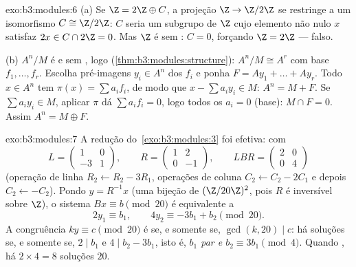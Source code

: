 \begin{solution}{exo:b3:modules:6}
(a) Se $\Z = 2\Z \oplus C$, a projeção $\Z \to \Z/2\Z$ se restringe a um isomorfismo $C \cong \Z/2\Z$: $C$
seria um subgrupo de $\Z$ cujo elemento não nulo $x$ satisfaz
$2x \in C
\cap 2\Z = 0$. Mas $\Z$ é sem : $C = 0$, forçando $\Z =
2\Z$ --- falso.

(b) $A^n/M$ é  e sem , logo 
(\cref{thm:b3:modules:structure}): $A^n/M \cong A^r$ com base $f_1, \dots, f_r$. Escolha pré-imagens $y_i \in A^n$ dos
$f_i$ e ponha $F = Ay_1 + \dots + Ay_r$. Todo $x \in A^n$ tem $\pi(x)
= \sum a_if_i$, de modo que $x - \sum a_iy_i \in M$: $A^n = M + F$.
Se $\sum a_iy_i \in M$, aplicar $\pi$ dá $\sum a_if_i = 0$, logo todos os $a_i = 0$ (base): $M \cap F = 0$.
Assim $A^n = M \oplus
F$.
\end{solution}

\begin{solution}{exo:b3:modules:7}
A redução do~\cref{exo:b3:modules:3} foi efetiva: com
\[
L = \begin{pmatrix} 1 & 0\\ -3 & 1\end{pmatrix},
\qquad
R = \begin{pmatrix} 1 & 2\\ 0 & -1 \end{pmatrix},
\qquad
LBR = \begin{pmatrix} 2 & 0\\ 0 & 4\end{pmatrix}
\]
(operação de linha $R_2 \leftarrow R_2 - 3R_1$, operações de coluna $C_2 \leftarrow C_2 - 2C_1$ e depois $C_2 \leftarrow -C_2$). Pondo
$y = R^{-1}x$ (uma bijeção de $(\Z/20\Z)^2$, pois $R$ é inversível sobre $\Z$), o
sistema $Bx \equiv b \pmod{20}$ é equivalente a
\[
2y_1 \equiv b_1, \qquad 4y_2 \equiv -3b_1 + b_2 \pmod{20}.
\]
A congruência $ky \equiv c \pmod{20}$ é  se, e somente se, $\gcd(k, 20) \mid c$: há soluções se, e
somente se, $2 \mid b_1$ e $4
\mid b_2 - 3b_1$, isto é, \emph{$b_1$ par e $b_2 \equiv 3b_1
\pmod 4$}. Quando
, há $2 \times 4 = 8$ soluções  $20$.
\end{solution}

